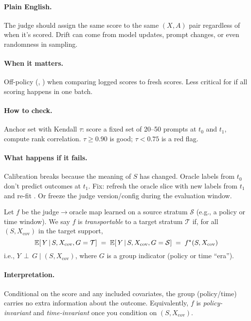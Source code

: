 \paragraph{Plain English.} The judge should assign the same score to the same $(X, A)$ pair regardless of when it's scored. Drift can come from model updates, prompt changes, or even randomness in sampling.

\paragraph{When it matters.} Off-policy (\ips, \dr) when comparing logged scores to fresh scores. Less critical for \dm{} if all scoring happens in one batch.

\paragraph{How to check.} Anchor set with Kendall $\tau$: score a fixed set of 20--50 prompts at $t_0$ and $t_1$, compute rank correlation. $\tau \ge 0.90$ is good; $\tau < 0.75$ is a red flag.

\paragraph{What happens if it fails.} Calibration breaks because the meaning of $S$ has changed. Oracle labels from $t_0$ don't predict outcomes at $t_1$. Fix: refresh the oracle slice with new labels from $t_1$ and re-fit \autocal. Or freeze the judge version/config during the evaluation window.

\begin{assumption}
\label{assum:transport}
Let $f$ be the judge$\to$oracle map learned on a source stratum $\mathcal{S}$ (e.g., a policy or time window).
We say $f$ is \emph{transportable} to a target stratum $\mathcal{T}$ if, for all $(S, X_{\mathrm{cov}})$ in the target support,
\[
\operatorname{\mathbb{E}}\!\left[\,Y \,\middle|\, S, X_{\mathrm{cov}}, G=\mathcal{T}\right]
\;=\;
\operatorname{\mathbb{E}}\!\left[\,Y \,\middle|\, S, X_{\mathrm{cov}}, G=\mathcal{S}\right]
\;=\; f^\star(S, X_{\mathrm{cov}})
\]
i.e., $Y \,\perp\, G \mid (S, X_{\mathrm{cov}})$, where $G$ is a group indicator (policy or time ``era'').
\end{assumption}

\paragraph{Interpretation.} Conditional on the score and any included covariates, the group (policy/time) carries no extra information about the outcome. Equivalently, $f$ is \emph{policy-invariant} and \emph{time-invariant} once you condition on $(S, X_{\mathrm{cov}})$.

